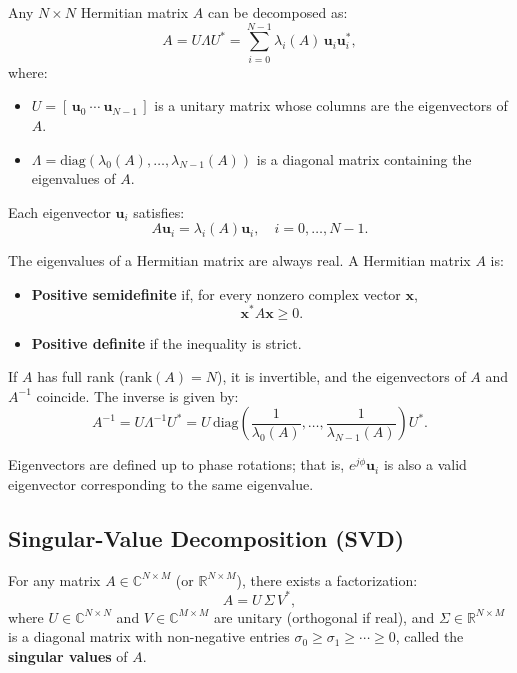 Any $N \times N$ Hermitian matrix $A$ can be decomposed as:
\[
A = U \Lambda U^* = \sum_{i=0}^{N-1} \lambda_i(A)\, \mathbf{u}_i \mathbf{u}_i^*, \tag{B.12, B.13}
\]
where:
\begin{itemize}
    \item $U = [\,\mathbf{u}_0 \ \cdots \ \mathbf{u}_{N-1}\,]$ is a unitary matrix whose columns are the eigenvectors of $A$.
    \item $\Lambda = \text{diag}(\lambda_0(A), \ldots, \lambda_{N-1}(A))$ is a diagonal matrix containing the eigenvalues of $A$.
\end{itemize}

Each eigenvector $\mathbf{u}_i$ satisfies:
\[
A \mathbf{u}_i = \lambda_i(A) \mathbf{u}_i, \quad i = 0, \ldots, N-1.\tag{B.14}
\]


The eigenvalues of a Hermitian matrix are always real. A Hermitian matrix $A$ is:
\begin{itemize}
    \item \textbf{Positive semidefinite} if, for every nonzero complex vector $\mathbf{x}$,
    \[
    \mathbf{x}^* A \mathbf{x} \geq 0. \tag{B.15}
    \]
    \item \textbf{Positive definite} if the inequality is strict.
\end{itemize}

If $A$ has full rank ($\text{rank}(A) = N$), it is invertible, and the eigenvectors of $A$ and $A^{-1}$ coincide. The inverse is given by:
\[
A^{-1} = U \Lambda^{-1} U^* = U \, \text{diag}\!\left(\frac{1}{\lambda_0(A)}, \ldots, \frac{1}{\lambda_{N-1}(A)}\right) U^*. \tag{B.16, B.17}
\]

Eigenvectors are defined up to phase rotations; that is, $e^{j\phi}\mathbf{u}_i$ is also a valid eigenvector corresponding to the same eigenvalue.

\subsection{Singular-Value Decomposition (SVD)}

For any matrix \(A \in \mathbb{C}^{N\times M}\) (or \(\mathbb{R}^{N\times M}\)), there exists a factorization:
\[
A = U\,\Sigma\,V^{*}, \tag{B.18}
\]
where \(U \in \mathbb{C}^{N\times N}\) and \(V \in \mathbb{C}^{M\times M}\) are unitary (orthogonal if real), and
\(\Sigma \in \mathbb{R}^{N\times M}\) is a diagonal matrix with non-negative entries
\(\sigma_0 \ge \sigma_1 \ge \cdots \ge 0\), called the \textbf{singular values} of \(A\).

